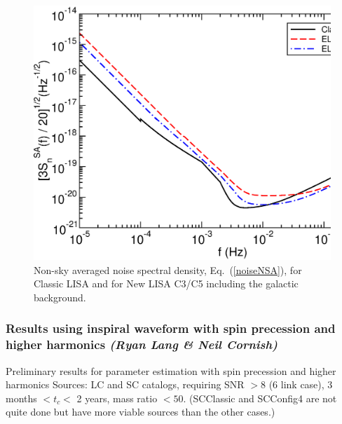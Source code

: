 \documentclass{iopart}
\begin{document}
%
\begin{figure}[H]
\begin{center}
\includegraphics[scale=0.33,clip=true]{FigEmanuele/noiseC3C5.eps}
\caption{\label{fig:PSDC3C5} Non-sky averaged noise spectral density,
  Eq.~(\ref{noiseNSA}), for Classic LISA and for New LISA C3/C5 including the
  galactic background.}
\end{center}
\end{figure}
%










\subsubsection{Results using inspiral waveform with spin precession and higher harmonics  {\it (Ryan Lang \& Neil Cornish)}}
\label{SSS:MBHbPEInspPrecHHRyan}


Preliminary results for parameter estimation with spin precession and higher harmonics
Sources: LC and SC catalogs, requiring SNR $> 8$ (6 link case), 3 months $< t_c < $ 2 years, mass ratio $< 50$.  (SCClassic and SCConfig4 are not quite done but have more viable sources than the other cases.)
\end{document}
